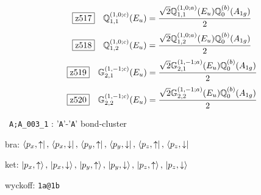 \documentclass[fleqn,10pt,landscape]{jsarticle}
\begin{document}
\begin{dmath*}
\hspace*{3mm}\fbox{z517}\quad \mathbb{Q}_{1,1}^{(1,0;c)}(E_{u})=\frac{\sqrt{2} \mathbb{Q}_{1,1}^{(1,0;a)}(E_{u}) \mathbb{Q}_{0}^{(b)}(A_{1g})}{2}
\end{dmath*}
\begin{dmath*}
\hspace*{3mm}\fbox{z518}\quad \mathbb{Q}_{1,2}^{(1,0;c)}(E_{u})=\frac{\sqrt{2} \mathbb{Q}_{1,2}^{(1,0;a)}(E_{u}) \mathbb{Q}_{0}^{(b)}(A_{1g})}{2}
\end{dmath*}
\begin{dmath*}
\hspace*{3mm}\fbox{z519}\quad \mathbb{G}_{2,1}^{(1,-1;c)}(E_{u})=\frac{\sqrt{2} \mathbb{G}_{2,1}^{(1,-1;a)}(E_{u}) \mathbb{Q}_{0}^{(b)}(A_{1g})}{2}
\end{dmath*}
\begin{dmath*}
\hspace*{3mm}\fbox{z520}\quad \mathbb{G}_{2,2}^{(1,-1;c)}(E_{u})=\frac{\sqrt{2} \mathbb{G}_{2,2}^{(1,-1;a)}(E_{u}) \mathbb{Q}_{0}^{(b)}(A_{1g})}{2}
\end{dmath*}
\vspace{5mm}

\noindent\textbullet\, \texttt{A;A_003_1} : '\texttt{A}'-'\texttt{A}' bond-cluster

\noindent\quad * bra: $\bra{p_{x},\uparrow},\, \bra{p_{x},\downarrow},\, \bra{p_{y},\uparrow},\, \bra{p_{y},\downarrow},\, \bra{p_{z},\uparrow},\, \bra{p_{z},\downarrow}$

\noindent\quad * ket: $\ket{p_{x},\uparrow},\, \ket{p_{x},\downarrow},\, \ket{p_{y},\uparrow},\, \ket{p_{y},\downarrow},\, \ket{p_{z},\uparrow},\, \ket{p_{z},\downarrow}$

\noindent\quad * wyckoff: \texttt{1a@1b}
\end{document}
